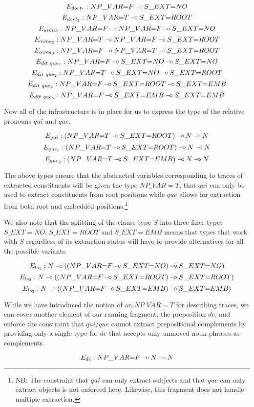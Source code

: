 $$
E_{dort_1} : NP\_VAR{=}F \mathbin{{-}\mkern-3.5mu{\circ}} S\_EXT{=}NO
$$
$$
E_{dort_2} : NP\_VAR{=}T \mathbin{{-}\mkern-3.5mu{\circ}} S\_EXT{=}ROOT
$$
$$
E_{aime_1} : NP\_VAR{=}F \mathbin{{-}\mkern-3.5mu{\circ}} NP\_VAR{=}F \mathbin{{-}\mkern-3.5mu{\circ}} S\_EXT{=}NO
$$
$$
E_{aime_2} : NP\_VAR{=}T \mathbin{{-}\mkern-3.5mu{\circ}} NP\_VAR{=}F \mathbin{{-}\mkern-3.5mu{\circ}} S\_EXT{=}ROOT
$$
$$
E_{aime_3} : NP\_VAR{=}F \mathbin{{-}\mkern-3.5mu{\circ}} NP\_VAR{=}T \mathbin{{-}\mkern-3.5mu{\circ}} S\_EXT{=}ROOT
$$
$$
E_{dit\ que_1} : NP\_VAR{=}F \mathbin{{-}\mkern-3.5mu{\circ}} S\_EXT{=}NO \mathbin{{-}\mkern-3.5mu{\circ}} S\_EXT{=}NO
$$
$$
E_{dit\ que_2} : NP\_VAR{=}T \mathbin{{-}\mkern-3.5mu{\circ}} S\_EXT{=}NO \mathbin{{-}\mkern-3.5mu{\circ}} S\_EXT{=}ROOT
$$
$$
E_{dit\ que_3} : NP\_VAR{=}F \mathbin{{-}\mkern-3.5mu{\circ}} S\_EXT{=}ROOT \mathbin{{-}\mkern-3.5mu{\circ}} S\_EXT{=}EMB
$$
$$
E_{dit\ que_4} : NP\_VAR{=}F \mathbin{{-}\mkern-3.5mu{\circ}} S\_EXT{=}EMB \mathbin{{-}\mkern-3.5mu{\circ}} S\_EXT{=}EMB
$$

Now all of the infrastructure is in place for us to express the type of
the relative pronouns $qui$ and $que$.

$$
E_{qui} : (NP\_VAR{=}T \mathbin{{-}\mkern-3.5mu{\circ}} S\_EXT{=}ROOT) \mathbin{{-}\mkern-3.5mu{\circ}} N \mathbin{{-}\mkern-3.5mu{\circ}} N
$$
$$
E_{que_1} : (NP\_VAR{=}T \mathbin{{-}\mkern-3.5mu{\circ}} S\_EXT{=}ROOT) \mathbin{{-}\mkern-3.5mu{\circ}} N \mathbin{{-}\mkern-3.5mu{\circ}} N
$$
$$
E_{que_2} : (NP\_VAR{=}T \mathbin{{-}\mkern-3.5mu{\circ}} S\_EXT{=}EMB) \mathbin{{-}\mkern-3.5mu{\circ}} N \mathbin{{-}\mkern-3.5mu{\circ}} N
$$

The above types ensure that the abstracted variables corresponding to
traces of extracted constituents will be given the type $NP\_VAR{=}T$,
that $qui$ can only be used to extract constituents from root positions
while $que$ allows for extraction from both root and embedded
positions.\footnote{NB: The constraint that $qui$ can only extract
  subjects and that $que$ can only extract objects is not enforced
  here. Likewise, this fragment does not handle multiple extraction.}

We also note that the splitting of the clause type $S$ into three finer
types $S\_EXT={NO}$, $S\_EXT{=}ROOT$ and $S\_EXT{=}EMB$ means that types
that work with $S$ regardless of its extraction status will have to
provide alternatives for all the possible variants.

$$
E_{le_1} : N \mathbin{{-}\mkern-3.5mu{\circ}} ((NP\_VAR{=}F \mathbin{{-}\mkern-3.5mu{\circ}} S\_EXT{=}NO) \mathbin{{-}\mkern-3.5mu{\circ}} S\_EXT{=}NO)
$$
$$
E_{le_2} : N \mathbin{{-}\mkern-3.5mu{\circ}} ((NP\_VAR{=}F \mathbin{{-}\mkern-3.5mu{\circ}} S\_EXT{=}ROOT) \mathbin{{-}\mkern-3.5mu{\circ}} S\_EXT{=}ROOT)
$$
$$
E_{le_3} : N \mathbin{{-}\mkern-3.5mu{\circ}} ((NP\_VAR{=}F \mathbin{{-}\mkern-3.5mu{\circ}} S\_EXT{=}EMB) \mathbin{{-}\mkern-3.5mu{\circ}} S\_EXT{=}EMB)
$$

While we have introduced the notion of an $NP\_VAR{=}T$ for describing
traces, we can cover another element of our running fragment, the
preposition $de$, and enforce the constraint that $qui$/$que$ cannot
extract prepositional complements by providing only a single type for
$de$ that accepts only unmoved noun phrases as complements.

$$
E_{de} : NP\_VAR{=}F \mathbin{{-}\mkern-3.5mu{\circ}} N \mathbin{{-}\mkern-3.5mu{\circ}} N
$$

